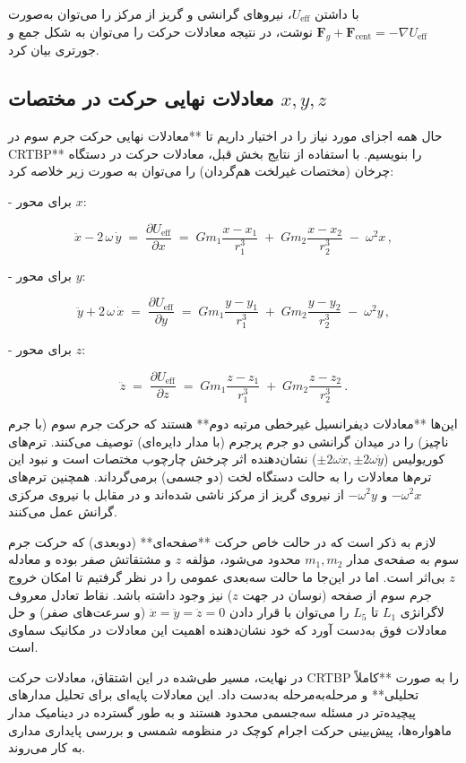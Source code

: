 با داشتن \(U_{\text{eff}}\)، نیروهای گرانشی و گریز از مرکز را می‌توان به‌صورت \( \mathbf{F}_g + \mathbf{F}_{\text{cent}} = -\nabla U_{\text{eff}} \) نوشت، در نتیجه معادلات حرکت را می‌توان به شکل جمع و جور‌تری بیان کرد.

\subsection{معادلات نهایی حرکت در مختصات \(x, y, z\)}

حال همه اجزای مورد نیاز را در اختیار داریم تا **معادلات نهایی حرکت جرم سوم در CRTBP** را بنویسیم. با استفاده از نتایج بخش قبل، معادلات حرکت در دستگاه چرخان (مختصات غیرلخت هم‌گردان) را می‌توان به صورت زیر خلاصه کرد: 

- برای محور \(x\): 

\[
\ddot{x} - 2\,\omega\,\dot{y} \;=\; \dfrac{\partial U_{\text{eff}}}{\partial x} \;=\; G m_1 \dfrac{x - x_1}{r_1^3}\;+\;G m_2 \dfrac{x - x_2}{r_2^3}\;-\;\omega^2 x\,,
\] 

- برای محور \(y\): 

\[
\ddot{y} + 2\,\omega\,\dot{x} \;=\; \dfrac{\partial U_{\text{eff}}}{\partial y} \;=\; G m_1 \dfrac{y - y_1}{r_1^3}\;+\;G m_2 \dfrac{y - y_2}{r_2^3}\;-\;\omega^2 y\,,
\] 

- برای محور \(z\): 

\[
\ddot{z} \;=\; \dfrac{\partial U_{\text{eff}}}{\partial z} \;=\; G m_1 \dfrac{z - z_1}{r_1^3}\;+\;G m_2 \dfrac{z - z_2}{r_2^3}\,. 
\] 

این‌ها **معادلات دیفرانسیل غیرخطی مرتبه دوم** هستند که حرکت جرم سوم (با جرم ناچیز) را در میدان گرانشی دو جرم پرجرم (با مدار دایره‌ای) توصیف می‌کنند. ترم‌های کوریولیس (\(\pm 2\omega\dot{x}, \pm 2\omega\dot{y}\)) نشان‌دهنده اثر چرخش چارچوب مختصات است و نبود این ترم‌ها معادلات را به حالت دستگاه لخت (دو جسمی) برمی‌گرداند. همچنین ترم‌های \(-\omega^2 x\) و \(-\omega^2 y\) از نیروی گریز از مرکز ناشی شده‌اند و در مقابل با نیروی مرکزی گرانش عمل می‌کنند. 

لازم به ذکر است که در حالت خاص حرکت **صفحه‌ای** (دو‌بعدی) که حرکت جرم سوم به صفحه‌ی مدار \(m_1, m_2\) محدود می‌شود، مؤلفه \(z\) و مشتقاتش صفر بوده و معادله \(z\) بی‌اثر است. اما در این‌جا ما حالت سه‌بعدی عمومی را در نظر گرفتیم تا امکان خروج جرم سوم از صفحه (نوسان در جهت \(z\)) نیز وجود داشته باشد. نقاط تعادل معروف لاگرانژی \(L_1\) تا \(L_5\) را می‌توان با قرار دادن \(\ddot{x}=\ddot{y}=\ddot{z}=0\) (و سرعت‌های صفر) و حل معادلات فوق به‌دست آورد که خود نشان‌دهنده اهمیت این معادلات در مکانیک سماوی است.

در نهایت، مسیر طی‌شده در این اشتقاق، معادلات حرکت CRTBP را به صورت **کاملاً تحلیلی** و مرحله‌به‌مرحله به‌دست داد. این معادلات پایه‌ای برای تحلیل مدارهای پیچیده‌تر در مسئله سه‌جسمی محدود هستند و به طور گسترده در دینامیک مدار ماهواره‌ها، پیش‌بینی حرکت اجرام کوچک در منظومه شمسی و بررسی پایداری مداری به کار می‌روند.



